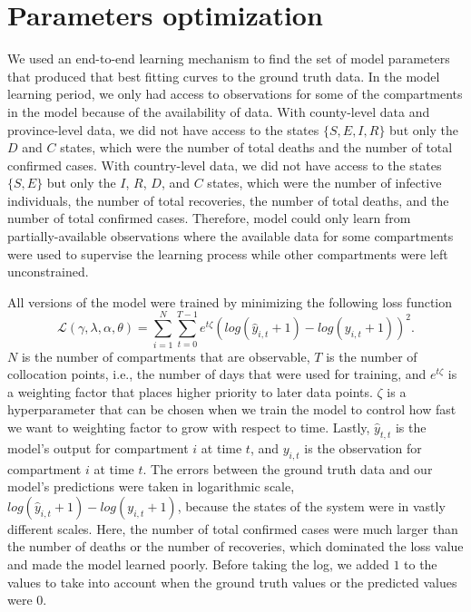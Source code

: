 \section{Parameters optimization}
\label{sec:methodologies-parameters-optimization}

We used an end-to-end learning mechanism to find the set of model parameters that produced that best fitting curves to the ground truth data.
In the model learning period, we only had access to observations for some of the compartments in the model because of the availability of data.
With county-level data and province-level data, we did not have access to the states $\{S, E, I, R\}$ but only the $D$ and $C$ states, which were the number of total deaths and the number of total confirmed cases.
With country-level data, we did not have access to the states $\{S, E\}$ but only the $I$, $R$, $D$, and $C$ states, which were the number of infective individuals, the number of total recoveries, the number of total deaths, and the number of total confirmed cases.
Therefore, model could only learn from partially-available observations where the available data for some compartments were used to supervise the learning process while other compartments were left unconstrained.

All versions of the model were trained by minimizing the following loss function
\begin{equation}
    \mathcal{L}(\gamma, \lambda, \alpha, \theta) = \sum_{i=1}^N \sum_{t=0}^{T-1} e^{t\zeta} (log(\hat{y}_{i,t} + 1) - log(y_{i,t} + 1))^2.
    \label{eq:ude-model-loss}
\end{equation}
$N$ is the number of compartments that are observable, $T$ is the number of collocation points, i.e., the number of days that were used for training, and $e^{t\zeta}$ is a weighting factor that places higher priority to later data points.
$\zeta$ is a hyperparameter that can be chosen when we train the model to control how fast we want to weighting factor to grow with respect to time.
Lastly, $\hat{y}_{t,t}$ is the model's output for compartment $i$ at time $t$, and $y_{i,t}$ is the observation for compartment $i$ at time $t$.
The errors between the ground truth data and our model's predictions were taken in logarithmic scale, $log(\hat{y}_{i,t} + 1) - log(y_{i,t} + 1)$, because the states of the system were in vastly different scales.
Here, the number of total confirmed cases were much larger than the number of deaths or the number of recoveries, which dominated the loss value and made the model learned poorly.
Before taking the log, we added $1$ to the values to take into account when the ground truth values or the predicted values were $0$.

